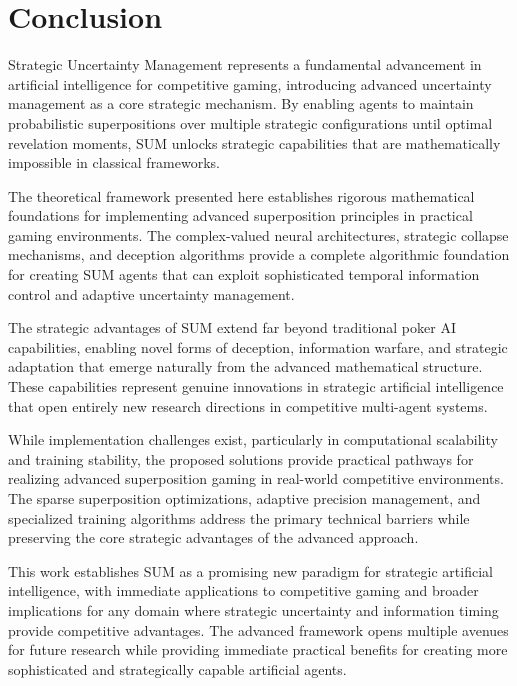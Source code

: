 \documentclass[11pt,a4paper]{article}
\begin{document}
\section{Conclusion}

Strategic Uncertainty Management represents a fundamental advancement in artificial intelligence for competitive gaming, introducing advanced uncertainty management as a core strategic mechanism. By enabling agents to maintain probabilistic superpositions over multiple strategic configurations until optimal revelation moments, SUM unlocks strategic capabilities that are mathematically impossible in classical frameworks.

The theoretical framework presented here establishes rigorous mathematical foundations for implementing advanced superposition principles in practical gaming environments. The complex-valued neural architectures, strategic collapse mechanisms, and deception algorithms provide a complete algorithmic foundation for creating SUM agents that can exploit sophisticated temporal information control and adaptive uncertainty management.

The strategic advantages of SUM extend far beyond traditional poker AI capabilities, enabling novel forms of deception, information warfare, and strategic adaptation that emerge naturally from the advanced mathematical structure. These capabilities represent genuine innovations in strategic artificial intelligence that open entirely new research directions in competitive multi-agent systems.

While implementation challenges exist, particularly in computational scalability and training stability, the proposed solutions provide practical pathways for realizing advanced superposition gaming in real-world competitive environments. The sparse superposition optimizations, adaptive precision management, and specialized training algorithms address the primary technical barriers while preserving the core strategic advantages of the advanced approach.

This work establishes SUM as a promising new paradigm for strategic artificial intelligence, with immediate applications to competitive gaming and broader implications for any domain where strategic uncertainty and information timing provide competitive advantages. The advanced framework opens multiple avenues for future research while providing immediate practical benefits for creating more sophisticated and strategically capable artificial agents.
\end{document}
